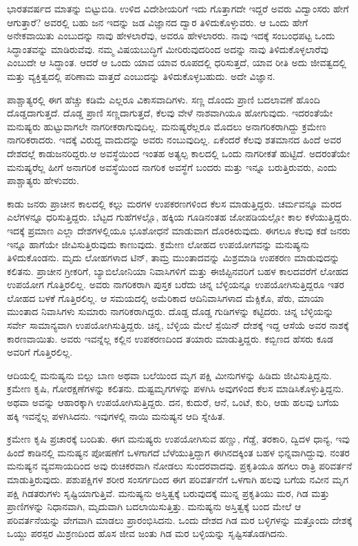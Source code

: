 ಭಾರತವರ್ಷದ ಮಾತನ್ನು ಬಿಟ್ಟುಬಿಡಿ. ಉಳಿದ ವಿದೇಶೀಯರಿಗೆ ಇದು ಗೊತ್ತಾಗದೇ ಇದ್ದರೆ ಅವರು ವಿದ್ವಾಂಸರು ಹೇಗೆ ಆಗುತ್ತಾರೆ? ಅವರಲ್ಲಿ ಬಹು ಜನ ಇದನ್ನು ಜಡ ವಿಜ್ಞಾನದ ದ್ವಾರ ತಿಳಿದುಕೊಳ್ಳುವರು. ಆ ಒಂದು ಹೇಗೆ ಅನೇಕವಾಯಿತು ಎಂಬುದನ್ನು ನಾವು ಹೇಳಲಾರೆವು, ಅವರೂ ಹೇಳಲಾರರು. ನಾವು ಇದಕ್ಕೆ ಸಂಬಂಧಪಟ್ಟ ಒಂದು ಸಿದ್ಧಾಂತವನ್ನು ಮಾಡಿರುವೆವು. ನಮ್ಮ ವಿಷಯಬುದ್ಧಿಗೆ ಮೀರಿರುವುದರಿಂದ ಅದನ್ನು ನಾವು ತಿಳಿದುಕೊಳ್ಳಲಾರೆವು ಎಂಬುದೇ ಆ ಸಿದ್ಧಾಂತ. ಆದರೆ ಆ ಒಂದು ಯಾವ ಯಾವ ರೂಪದಲ್ಲಿ ಧರಿಸುತ್ತದೆ, ಯಾವ ರೀತಿ ಅದು ಜೀವತ್ವದಲ್ಲಿ ಮತ್ತು ವ್ಯಕ್ತಿತ್ವದಲ್ಲಿ ಪರಿಣಾಮ ವಾತ್ತದೆ ಎಂಬುದನ್ನು ತಿಳಿದುಕೊಳ್ಳಬಹುದು. ಅದೇ ವಿಜ್ಞಾನ.

ಪಾಶ್ಚಾತ್ಯರಲ್ಲಿ ಈಗ ಹೆಚ್ಚು ಕಡಿಮೆ ಎಲ್ಲರೂ ವಿಕಾಸವಾದಿಗಳು. ಸಣ್ಣ ದೊಂದು ಪ್ರಾಣಿ ಬದಲಾವಣೆ ಹೊಂದಿ ದೊಡ್ಡದಾಗುತ್ತದೆ. ದೊಡ್ಡ ಪ್ರಾಣಿ ಸಣ್ಣದಾಗುತ್ತದೆ, ಕೆಲವು ವೇಳೆ ನಾಶವಾಗಿಯೂ ಹೋಗುವುದು. ಇದರಂತೆಯೇ ಮನುಷ್ಯರು ಹುಟ್ಟುವಾಗಲೇ ನಾಗರೀಕರಾಗುವುದಿಲ್ಲ. ಮನುಷ್ಯರೆಲ್ಲರೂ ಮೊದಲು ಅನಾಗರಿಕರಾಗಿದ್ದು ಕ್ರಮೇಣ ನಾಗರಿಕರಾದರು. ಇದಕ್ಕೆ ವಿರುದ್ದ ವಾದುದನ್ನು ಅವರು ನಂಬುವುದಿಲ್ಲ. ಏಕೆಂದರೆ ಕೆಲವು ಶತಮಾನದ ಹಿಂದೆ ಅವರ ದೇಶದಲ್ಲೆ ಕಾಡುಜನರಿದ್ದರು.ಆ ಅವಸ್ಥೆಯಿಂದ ಇಂತಹ ಅತ್ಯಲ್ಪ ಕಾಲದಲ್ಲಿ ಒಂದು ನಾಗರೀಕತೆ ಹುಟ್ಟಿದೆ. ಅದರಂತೆಯೇ ಮನುಷ್ಯರೆಲ್ಲ ಹೀಗೆ ಅನಾಗರಿಕ ಅವಸ್ಥೆಯಿಂದ ನಾಗರಿಕ ಅವಸ್ಥೆಗೆ ಬಂದರು ಮತ್ತು ಇನ್ನೂ ಬರುತ್ತಿರುವರು, ಎಂದು ಪಾಶ್ಚಾತ್ಯರು ಹೇಳುವರು.

ಕಾಡು ಜನರು ಪ್ರಾಚೀನ ಕಾಲದಲ್ಲಿ ಕಲ್ಲು ಮರಗಳ ಉಪಕರಣಗಳಿಂದ ಕೆಲಸ ಮಾಡುತ್ತಿದ್ದರು. ಚರ್ಮವನ್ನೂ ಮರದ ಎಲೆಗಳನ್ನೂ ಧರಿಸುತ್ತಿದ್ದರು. ಬೆಟ್ಟದ ಗುಹೆಗಳಲ್ಲೊ, ಹಕ್ಕಿಯ ಗೂಡಿನಂತಹ ಜೋಪಡಿಯಲ್ಲೋ ಕಾಲ ಕಳೆಯುತ್ತಿದ್ದರು. ಇದಕ್ಕೆ ಪ್ರಮಾಣ ಎಲ್ಲಾ ದೇಶಗಳಲ್ಲಿಯೂ ಭೂಶೋಧನೆ ಮಾಡುವಾಗ ದೊರಕಿರುವುದು. ಈಗಲೂ ಕೆಲವು ಕಡೆ ಜನರು ಇನ್ನೂ ಹಾಗೆಯೇ ಜೀವಿಸುತ್ತಿರುವುದು ಕಾಣುವುದು. ಕ್ರಮೇಣ ಲೋಹದ ಉಪಯೋಗವನ್ನು ಮನುಷ್ಯನು ತಿಳಿದುಕೊಂಡನು. ಮೃದು ಲೋಹಗಳಾದ ಟಿನ್​, ತಾಮ್ರ ಮುಂತಾದವನ್ನು ಮಿಶ್ರಮಾಡಿ ಉಪಕರಣ ಮಾಡುವುದನ್ನು ಕಲಿತನು. ಪ್ರಾಚೀನ ಗ್ರೀಕರಿಗೆ, ಬ್ಯಾಬಿಲೋನಿಯಾ ನಿವಾಸಿಗಳಿಗೆ ಮತ್ತು ಈಜಿಪ್ಟಿನವರಿಗೆ ಬಹಳ ಕಾಲದವರೆಗೆ ಲೋಹದ ಉಪಯೋಗ ಗೊತ್ತಿರಲಿಲ್ಲ. ಅವರು ನಾಗರಿಕರಾಗಿ ಪುಸ್ತಕ ಬರೆದು ಚಿನ್ನ ಬೆಳ್ಳಿಯನ್ನೂ ಉಪಯೋಗಿಸುತ್ತಿದ್ದರೂ ಇತರ ಲೋಹದ ಬಳಕೆ ಗೊತ್ತಿರಲಿಲ್ಲ. ಆ ಸಮಯದಲ್ಲಿ ಅಮೆರಿಕಾದ ಆದಿನಿವಾಸಿಗಳಾದ ಮೆಕ್ಸಿಕೊ, ಪೆರು, ಮಾಯಾ ಮುಂತಾದ ನಿವಾಸಿಗಳು ಸುಮಾರು ನಾಗರಿಕರಾಗಿದ್ದರು. ದೊಡ್ಡ ದೊಡ್ಡ ಗುಡಿಗಳನ್ನು ಕಟ್ಟಿದರು. ಚಿನ್ನ ಬೆಳ್ಳಿಯನ್ನು ಸರ್ವೇ ಸಾಮಾನ್ಯವಾಗಿ ಉಪಯೋಗಿಸುತ್ತಿದ್ದರು. ಚಿನ್ನ, ಬೆಳ್ಳಿಯ ಮೇಲೆ ಸ್ಪೆಯಿನ್​ ದೇಶಕ್ಕೆ ಇದ್ದ ಆಸೆಯೆ ಅವರ ನಾಶಕ್ಕೆ ಕಾರಣವಾಯಿತು. ಅವರು ಇವನ್ನೆಲ್ಲ ಕಲ್ಲಿನ ಉಪಕರಣದಿಂದ ತಯಾರು ಮಾಡುತ್ತಿದ್ದರು. ಕಬ್ಬಿಣದ ಹೆಸರು ಕೂಡ ಅವರಿಗೆ ಗೊತ್ತಿರಲಿಲ್ಲ.

ಆದಿಯಲ್ಲಿ ಮನುಷ್ಯನು ಬಿಲ್ಲು ಬಾಣ ಅಥವಾ ಬಲೆಯಿಂದ ಮೃಗ ಪಕ್ಷಿ ಮೀನುಗಳನ್ನು ಹಿಡಿದು ಜೀವಿಸುತ್ತಿದ್ದನು. ಕ್ರಮೇಣ ಕೃಷಿ, ಗೋರಕ್ಷಣೆಗಳನ್ನು ಕಲಿತನು. ದುಷ್ಟಮೃಗಗಳನ್ನು ಪಳಗಿಸಿ ಅವುಗಳಿಂದ ಕೆಲಸ ಮಾಡಿಸಿಕೊಳ್ಳುತ್ತಿದ್ದನು. ಅಥವಾ ಅವನ್ನು ಆಹಾರಕ್ಕಾಗಿ ಉಪಯೋಗಿಸುತ್ತಿದ್ದರು. ದನ, ಕುದುರೆ, ಆನೆ, ಒಂಟೆ, ಕುರಿ, ಆಡು ಹಲವು ಬಗೆಯ ಹಕ್ಕಿ ಇವನ್ನೆಲ್ಲ ಪಳಗಿಸಿದನು. ಇವುಗಳಲ್ಲಿ ನಾಯಿ ಮನುಷ್ಯನ ಆದಿ ಸ್ನೇಹಿತ.

ಕ್ರಮೇಣ ಕೃಷಿ ಪ್ರಚಾರಕ್ಕೆ ಬಂದಿತು. ಈಗ ಮನುಷ್ಯರು ಉಪಯೋಗಿಸುವ ಹಣ್ಣು, ಗೆಡ್ಡೆ, ತರಕಾರಿ, ದ್ವಿದಳ ಧಾನ್ಯ, ಇವು ಹಿಂದೆ ಕಾಡಿನಲ್ಲಿ ಮನುಷ್ಯನ ಪೋಷಣೆಗೆ ಒಳಗಾಗದೆ ಬೆಳೆಯುತ್ತಿದ್ದಾಗ ಈಗಿನದಕ್ಕಿಂತ ಬಹಳ ಭಿನ್ನವಾಗಿದ್ದುವು. ನಂತರ ಮನುಷ್ಯನ ವ್ಯವಸಾಯದಿಂದ ಅವು ರುಚಿಕರವಾಗಿ ನೋಡಲು ಸುಂದರವಾದವು. ಪ್ರಕೃತಿಯೂ ಹಗಲು ರಾತ್ರಿ ಪರಿವರ್ತನೆ ಮಾಡುತ್ತಿರುವುದು. ಪಶುಪಕ್ಷಿಗಳ ಶರೀರ ಸಂಸರ್ಗದಿಂದ ಈಗ ಪರಿವರ್ತನೆಗೆ ಒಳಗಾಗಿ ಹಲವು ಬಗೆಯ ನವೀನ ಮೃಗ ಪಕ್ಷಿ ಗಿಡತರುಗಳು ಸೃಷ್ಟಿಯಾಗುತ್ತಿವೆ. ಮನುಷ್ಯನು ಅಸ್ತಿತ್ವಕ್ಕೆ ಬರುವುದಕ್ಕೆ ಮುನ್ನ ಪ್ರಕೃತಿಯು ಮರ, ಗಿಡ ಮತ್ತು ಪ್ರಾಣಿಗಳನ್ನು ನಿಧಾನವಾಗಿ, ಮೃದುವಾಗಿ ಬದಲಾಯಿಸುತ್ತಿತ್ತು. ಮನುಷ್ಯನು ಅಸ್ತಿತ್ವಕ್ಕೆ ಬಂದ ಮೇಲೆ ಆ ಪರಿವರ್ತನೆಯನ್ನು ವೇಗವಾಗಿ ಮಾಡಲು ಪ್ರಾರಂಭಿಸಿದನು. ಒಂದು ದೇಶದ ಗಿಡ ಮರ ಬಳ್ಳಿಗಳನ್ನು ಮತ್ತೊಂದು ದೇಶಕ್ಕೆ ಒಯ್ದು ಪರಸ್ಪರ ಮಿಶ್ರಣದಿಂದ ಹೊಸ ಜೀವ ಜಂತು ಗಿಡ ಮರ ಬಳ್ಳಿಯನ್ನು ಸೃಷ್ಟಿಸತೊಡಗಿದನು.

